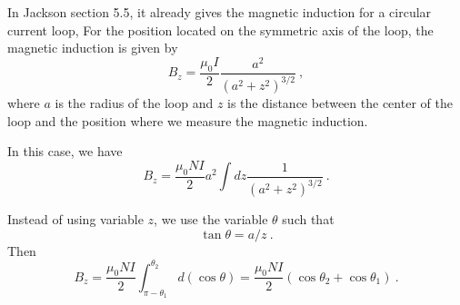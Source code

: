 \documentclass[12pt]{article}
\begin{document}
\newpage
{} In Jackson section 5.5, it already gives the magnetic induction for a circular current loop,
For the position located on the symmetric axis of the loop, the magnetic induction is given by
\begin{equation}
    B_z = \frac{\mu_0 I}{2} \frac{a^2}{(a^2 + z^2)^{3/2}}~,
\end{equation}
where $a$ is the radius of the loop and $z$ is the distance between the center of the loop and the position where we measure the magnetic induction.

In this case, we have
\begin{equation}
    B_z  = \frac{\mu_0 N I}{2} a^2 \int dz  \frac{1}{(a^2 + z^2)^{3/2}}~.
\end{equation}

Instead of using variable $z$, we use the variable $\theta$ such that
\begin{equation}
    \tan \theta = a/z~.
\end{equation}
Then
\begin{equation}
    \boxed{
    B_z = \frac{\mu_0 N I}{2} \int_{\pi - \theta_1}^{\theta_2} d(\cos \theta) = \frac{\mu_0 N I}{2} (\cos \theta_2 + \cos \theta_1)~.
    }
\end{equation}
\end{document}
